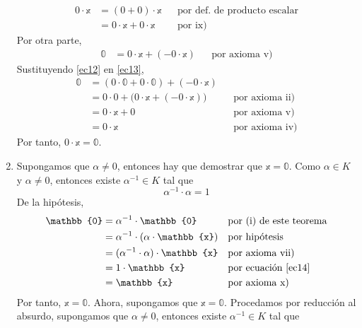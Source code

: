 \begin{theorem}{}{}
\begin{enumerate}[label=\roman*., topsep=6pt, itemsep=0pt]
        \begin{align}
            0 \cdot \mathbb{x} & = (0 + 0) \cdot \mathbb{x} && \text{por def. de producto escalar} \label{ec11} \\
            & = 0 \cdot \mathbb{x} + 0 \cdot \mathbb{x} && \text{por ix)} \label{ec12}
        \end{align}
        Por otra parte,
        \begin{align}
            \mathbb{0} & = 0 \cdot \mathbb{x} + (-0 \cdot \mathbb{x}) && \text{por axioma v)} \label{ec13}
        \end{align}
        Sustituyendo \eqref{ec12} en \eqref{ec13},
        \begin{align*}
            \mathbb{0} & = (0 \cdot \mathbb{0} + 0 \cdot \mathbb{0}) + (-0 \cdot \mathbb{x}) \\
            & = 0 \cdot 0 + \big( 0 \cdot \mathbb{x} + (-0 \cdot \mathbb{x}) \big) && \text{por axioma ii)} \\
            & = 0 \cdot \mathbb{x} + 0 && \text{por axioma v)} \\
            & = 0 \cdot \mathbb{x} && \text{por axioma iv)}
        \end{align*}
        Por tanto, $0 \cdot \mathbb{x} = \mathbb{0}$.
        \item Supongamos que $\alpha \neq 0$, entonces hay que demostrar que $\mathbb{x} = \mathbb{0}$. Como $\alpha \in K$ y $\alpha \neq 0$, entonces existe $\alpha^{-1} \in K$ tal que
        \begin{equation}
            \alpha^{-1} \cdot \alpha = 1 \label{ec14}
        \end{equation}
        De la hipótesis,
        \begin{align*}
            \mathbb{0} & = \alpha^{-1} \cdot \mathbb{0} && \text{por (i) de este teorema} \\
            & = \alpha^{-1} \cdot (\alpha \cdot \mathbb{x}) && \text{por hipótesis} \\
            & = (\alpha^{-1} \cdot \alpha) \cdot \mathbb{x} && \text{por axioma vii)} \\
            & = 1 \cdot \mathbb{x} && \text{por ecuación \eqref{ec14}} \\
            & = \mathbb{x} && \text{por axioma x)}
        \end{align*}
        Por tanto, $\mathbb{x} = \mathbb{0}$. Ahora, supongamos que $\mathbb{x} = \mathbb{0}$. Procedamos por reducción al absurdo, supongamos que $\alpha \neq 0$, entonces existe $\alpha^{-1} \in K$ tal que

\end{enumerate}
\end{theorem}
